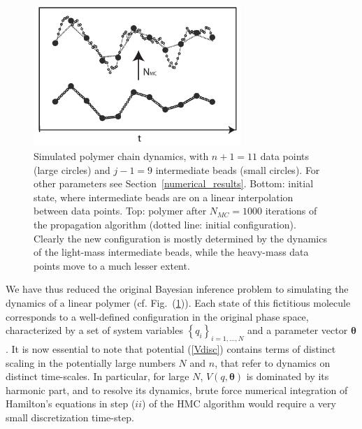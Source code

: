 \documentclass[11pt]{article}
\theoremstyle{definition}
\newcommand{\bt}{\pmb\theta}
\begin{document}

\begin{figure}[htb!]
    \centering
    \includegraphics[width=0.7\textwidth]{FigPolymer2.pdf}
    \caption{Simulated polymer chain dynamics, with $n+1=11$ data points (large circles) and $j-1=9$ intermediate beads (small circles). For other parameters see Section~\ref{numerical_results}. Bottom: initial state, where intermediate beads are on a linear interpolation between data points. Top: polymer after $N_{MC}=1000$ iterations of the propagation algorithm (dotted line: initial configuration). Clearly the new configuration is mostly determined by the dynamics of the light-mass intermediate beads, while the heavy-mass data points move to a much lesser extent.}
    \label{fig:polymer}
\end{figure}

We have thus reduced the original Bayesian inference problem to simulating the dynamics of a linear polymer (cf. Fig.~(\ref{fig:polymer})). Each state of this fictitious molecule corresponds to a well-defined configuration in the original phase space, characterized by a set of system variables $\left\{q_i\right\}_{i=1,\dots,N}$ and a parameter vector $\bt$. It is now essential to note that potential (\ref{Vdisc}) contains terms of distinct scaling in the potentially large numbers $N$ and $n$, that refer to dynamics on distinct time-scales. In particular, for large $N$, $V(q,\bt)$ is dominated by its harmonic part, and to resolve its dynamics, brute force numerical integration of Hamilton's equations in step ($ii$) of the HMC algorithm would require a very small discretization time-step.
\end{document}
